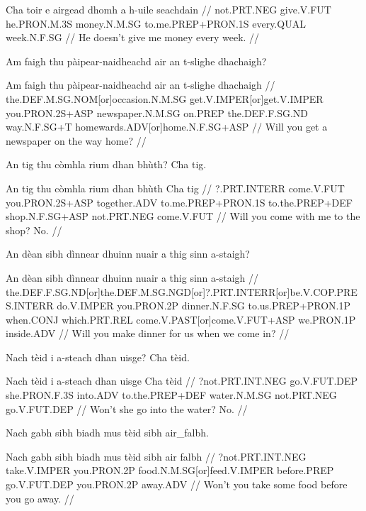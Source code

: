 \documentclass[a4paper,10pt]{article}
\begin{document}
\vspace{4mm}
\gla Cha toir e airgead dhomh {a h-uile} seachdain  //
\glb not.PRT.NEG give.V.FUT he.PRON.M.3S money.N.M.SG to.me.PREP+PRON.1S every.QUAL week.N.F.SG  //
\glft He doesn't give me money every week. //
\endgl
\xe

\ex
\begingl
\glpre Am faigh thu pàipear-naidheachd air an t-slighe dhachaigh? 

\vspace{4mm}
\gla Am faigh thu pàipear-naidheachd air an t-slighe dhachaigh  //
\glb the.DEF.M.SG.NOM[or]occasion.N.M.SG get.V.IMPER[or]get.V.IMPER you.PRON.2S+ASP newspaper.N.M.SG on.PREP the.DEF.F.SG.ND way.N.F.SG+T homewards.ADV[or]home.N.F.SG+ASP  //
\glft Will you get a newspaper on the way home? //
\endgl
\xe

\ex
\begingl
\glpre An tig thu còmhla rium dhan bhùth? Cha tig. 

\vspace{4mm}
\gla An tig thu còmhla rium dhan bhùth Cha tig  //
\glb ?.PRT.INTERR come.V.FUT you.PRON.2S+ASP together.ADV to.me.PREP+PRON.1S to.the.PREP+DEF shop.N.F.SG+ASP not.PRT.NEG come.V.FUT  //
\glft Will you come with me to the shop? No. //
\endgl
\xe

\ex
\begingl
\glpre An dèan sibh dìnnear dhuinn nuair a thig sinn a-staigh? 

\vspace{4mm}
\gla An dèan sibh dìnnear dhuinn nuair a thig sinn a-staigh  //
\glb the.DEF.F.SG.ND[or]the.DEF.M.SG.NGD[or]?.PRT.INTERR[or]be.V.COP.PRES.INTERR do.V.IMPER you.PRON.2P dinner.N.F.SG to.us.PREP+PRON.1P when.CONJ which.PRT.REL come.V.PAST[or]come.V.FUT+ASP we.PRON.1P inside.ADV  //
\glft Will you make dinner for us when we come in? //
\endgl
\xe

\ex
\begingl
\glpre Nach tèid i a-steach dhan uisge? Cha tèid. 

\vspace{4mm}
\gla Nach tèid i a-steach dhan uisge Cha tèid  //
\glb ?not.PRT.INT.NEG go.V.FUT.DEP she.PRON.F.3S into.ADV to.the.PREP+DEF water.N.M.SG not.PRT.NEG go.V.FUT.DEP  //
\glft Won't she go into the water? No. //
\endgl
\xe

\ex
\begingl
\glpre Nach gabh sibh biadh mus tèid sibh air\_falbh. 

\vspace{4mm}
\gla Nach gabh sibh biadh mus tèid sibh {air falbh}  //
\glb ?not.PRT.INT.NEG take.V.IMPER you.PRON.2P food.N.M.SG[or]feed.V.IMPER before.PREP go.V.FUT.DEP you.PRON.2P away.ADV  //
\glft Won't you take some food before you go away. //
\endgl
\xe
\end{document}
